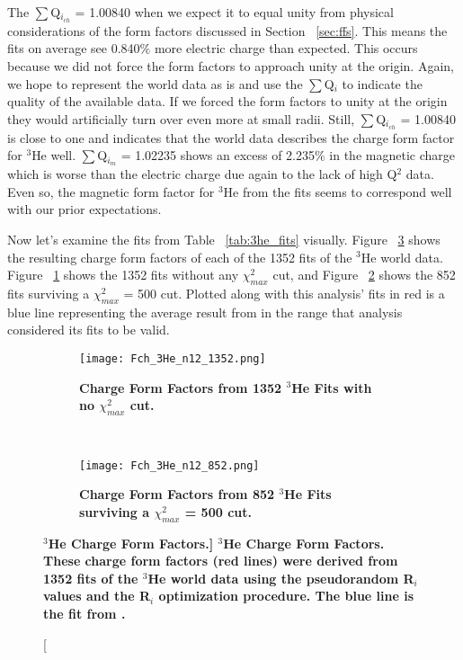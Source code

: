 The $\sum$Q$_{i_{ch}}$ = 1.00840 when we expect it to equal unity from physical considerations of the form factors discussed in Section ~\ref{sec:ffs}. This means the fits on average see 0.840$\%$ more electric charge than expected. This occurs because we did not force the form factors to approach unity at the origin. Again, we hope to represent the world data as is and use the $\sum$Q$_{i}$ to indicate the quality of the available data. If we forced the form factors to unity at the origin they would artificially turn over even more at small radii. Still, $\sum$Q$_{i_{ch}}$ = 1.00840 is close to one and indicates that the world data describes the charge form factor for $^3$He well. $\sum$Q$_{i_{m}}$ = 1.02235 shows an excess of 2.235$\%$ in the magnetic charge which is worse than the electric charge due again to the lack of high Q$^2$ data. Even so, the magnetic form factor for $^3$He from the fits seems to correspond well with our prior expectations. 

Now let's examine the fits from Table ~\ref{tab:3he_fits} visually. Figure ~\ref{fig:3he_fch} shows the resulting charge form factors of each of the 1352 fits of the $^3$He world data. Figure ~\ref{fig:3he_fch_no_cut} shows the 1352 fits without any $\chi^2_{max}$ cut, and Figure ~\ref{fig:3he_fch_cut} shows the 852 fits surviving a $\chi^2_{max}$ = 500 cut. Plotted along with this analysis' fits in red is a blue line representing the average result from \cite{Article:Amroun} in the range that analysis considered its fits to be valid. 

\begin{figure}[!ht]
\begin{subfigure}{1.\textwidth}
  \centering
  \texttt{[image: Fch\_3He\_n12\_1352.png]}
  \caption{\bf{Charge Form Factors from 1352 $^3$He Fits with no $\chi^2_{max}$ cut.}}
  \label{fig:3he_fch_no_cut}
\end{subfigure}\\
\begin{subfigure}{1.\textwidth}
  \centering
  \texttt{[image: Fch\_3He\_n12\_852.png]}
  \caption{\bf{Charge Form Factors from 852 $^3$He Fits surviving a $\chi^2_{max}$ = 500 cut.}}
  \label{fig:3he_fch_cut}
\end{subfigure}
\caption[\bf{$^3$He Charge Form Factors.}] {
{\bf{$^3$He Charge Form Factors.}} These charge form factors (red lines) were derived from 1352 fits of the $^3$He world data using the pseudorandom R$_i$ values and the R$_i$ optimization procedure. The blue line is the fit from \cite{Article:Amroun}.}
\label{fig:3he_fch}
\end{figure}

